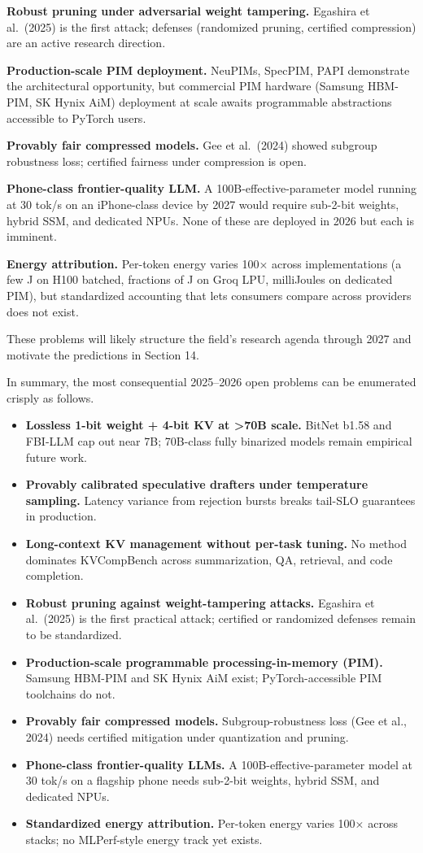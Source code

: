 \textbf{Robust pruning under adversarial weight tampering.} Egashira et al.~(2025) is the first attack; defenses (randomized pruning, certified compression) are an active research direction.

\textbf{Production-scale PIM deployment.} NeuPIMs, SpecPIM, PAPI demonstrate the architectural opportunity, but commercial PIM hardware (Samsung HBM-PIM, SK Hynix AiM) deployment at scale awaits programmable abstractions accessible to PyTorch users.

\textbf{Provably fair compressed models.} Gee et al.~(2024) showed subgroup robustness loss; certified fairness under compression is open.

\textbf{Phone-class frontier-quality LLM.} A 100B-effective-parameter model running at 30 tok/s on an iPhone-class device by 2027 would require sub-2-bit weights, hybrid SSM, and dedicated NPUs. None of these are deployed in 2026 but each is imminent.

\textbf{Energy attribution.} Per-token energy varies 100× across implementations (a few J on H100 batched, fractions of J on Groq LPU, milliJoules on dedicated PIM), but standardized accounting that lets consumers compare across providers does not exist.

These problems will likely structure the field's research agenda through 2027 and motivate the predictions in Section 14.

In summary, the most consequential 2025--2026 open problems can be enumerated crisply as follows.

\begin{itemize}
\tightlist
\item
  \textbf{Lossless 1-bit weight + 4-bit KV at \textgreater70B scale.} BitNet b1.58 and FBI-LLM cap out near 7B; 70B-class fully binarized models remain empirical future work.
\item
  \textbf{Provably calibrated speculative drafters under temperature sampling.} Latency variance from rejection bursts breaks tail-SLO guarantees in production.
\item
  \textbf{Long-context KV management without per-task tuning.} No method dominates KVCompBench across summarization, QA, retrieval, and code completion.
\item
  \textbf{Robust pruning against weight-tampering attacks.} Egashira et al.~(2025) is the first practical attack; certified or randomized defenses remain to be standardized.
\item
  \textbf{Production-scale programmable processing-in-memory (PIM).} Samsung HBM-PIM and SK Hynix AiM exist; PyTorch-accessible PIM toolchains do not.
\item
  \textbf{Provably fair compressed models.} Subgroup-robustness loss (Gee et al., 2024) needs certified mitigation under quantization and pruning.
\item
  \textbf{Phone-class frontier-quality LLMs.} A 100B-effective-parameter model at 30 tok/s on a flagship phone needs sub-2-bit weights, hybrid SSM, and dedicated NPUs.
\item
  \textbf{Standardized energy attribution.} Per-token energy varies 100× across stacks; no MLPerf-style energy track yet exists.
\end{itemize}

